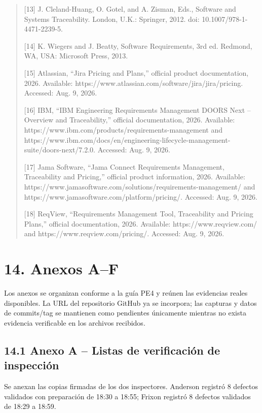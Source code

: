 \documentclass[12pt]{article}
\begin{document}
\begin{quote}
{[}13{]} J. Cleland-Huang, O. Gotel, and A. Zisman, Eds., Software and Systems Traceability. London, U.K.: Springer, 2012. doi: 10.1007/978-1-4471-2239-5.

{[}14{]} K. Wiegers and J. Beatty, Software Requirements, 3rd ed. Redmond, WA, USA: Microsoft Press, 2013.

{[}15{]} Atlassian, ``Jira Pricing and Plans,'' official product documentation, 2026. Available: https://www.atlassian.com/software/jira/jira/pricing. Accessed: Aug. 9, 2026.

{[}16{]} IBM, ``IBM Engineering Requirements Management DOORS Next -- Overview and Traceability,'' official documentation, 2026. Available: https://www.ibm.com/products/requirements-management and https://www.ibm.com/docs/en/engineering-lifecycle-management-suite/doors-next/7.2.0. Accessed: Aug. 9, 2026.

{[}17{]} Jama Software, ``Jama Connect Requirements Management, Traceability and Pricing,'' official product information, 2026. Available: https://www.jamasoftware.com/solutions/requirements-management/ and https://www.jamasoftware.com/platform/pricing/. Accessed: Aug. 9, 2026.

{[}18{]} ReqView, ``Requirements Management Tool, Traceability and Pricing Plans,'' official documentation, 2026. Available: https://www.reqview.com/ and https://www.reqview.com/pricing/. Accessed: Aug. 9, 2026.
\end{quote}

\section{\texorpdfstring{14. Anexos A--F}{14. Anexos A--F}}\label{anexos-af}

Los anexos se organizan conforme a la guía PE4 y reúnen las evidencias reales disponibles. La URL del repositorio GitHub ya se incorpora; las capturas y datos de commits/tag se mantienen como pendientes únicamente mientras no exista evidencia verificable en los archivos recibidos.

\subsection{\texorpdfstring{14.1 Anexo A -- Listas de verificación de inspección}{14.1 Anexo A -- Listas de verificación de inspección}}\label{anexo-a-listas-de-verificaciuxf3n-de-inspecciuxf3n}

Se anexan las copias firmadas de los dos inspectores. Anderson registró 8 defectos validados con preparación de 18:30 a 18:55; Frixon registró 8 defectos validados de 18:29 a 18:59.
\end{document}
